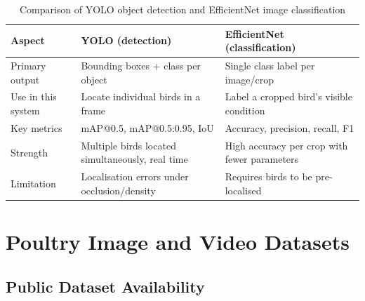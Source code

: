 \documentclass[12pt,a4paper]{report}
\begin{document}
\begin{table}[tbp]
\caption{Comparison of YOLO object detection and EfficientNet image classification}
\label{tab:yoloeff}
\centering
\small
\begin{tabularx}{\textwidth}{|l|X|X|}
\hline
\rowcolor{headerblue}
\textbf{Aspect} & \textbf{YOLO (detection)} & \textbf{EfficientNet (classification)} \\
\hline
Primary output & Bounding boxes + class per object & Single class label per image/crop \\
\hline
Use in this system & Locate individual birds in a frame & Label a cropped bird's visible condition \\
\hline
Key metrics & mAP@0.5, mAP@0.5:0.95, IoU & Accuracy, precision, recall, F1 \\
\hline
Strength & Multiple birds located simultaneously, real time & High accuracy per crop with fewer parameters \\
\hline
Limitation & Localisation errors under occlusion/density & Requires birds to be pre-localised \\
\hline
\end{tabularx}
\end{table}

\section{Poultry Image and Video Datasets}

\subsection{Public Dataset Availability}
\end{document}
